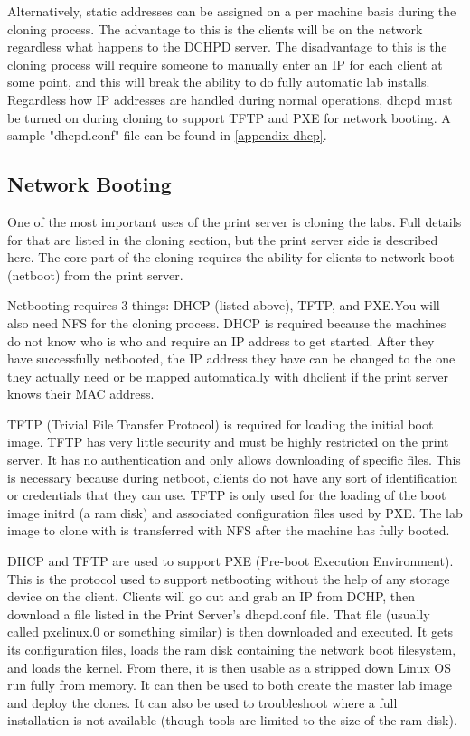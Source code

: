 Alternatively, static addresses can be assigned on a per machine basis during the cloning process.  The advantage to this is the clients will be on the network regardless what happens to the DCHPD server.  The disadvantage to this is the cloning process will require someone to manually enter an IP for each client at some point, and this will break the ability to do fully automatic lab installs.   Regardless how IP addresses are handled during normal operations, dhcpd must be turned on during cloning to support TFTP and PXE for network booting.  A sample "dhcpd.conf" file can be found in \ref{appendix dhcp}.

\subsection{Network Booting}
One of the most important uses of the print server is cloning the labs.  Full details for that are listed in the cloning section, but the print server side is described here.  The core part of the cloning requires the ability for clients to network boot (netboot) from the print server.  

Netbooting requires 3 things:  DHCP (listed above), TFTP, and PXE.You will also need NFS for the cloning process.  DHCP is required because the machines do not know who is who and require an IP address to get started.  After they have successfully netbooted, the IP address they have can be changed to the one they actually need or be mapped automatically with dhclient if the print server knows their MAC address.  

TFTP (Trivial File Transfer Protocol) is required for loading the initial boot image.  TFTP has very little security and must be highly restricted on the print server.  It has no authentication and only allows downloading of specific files.  This is necessary because during netboot, clients do not have any sort of identification or credentials that they can use.  TFTP is only used for the loading of the boot image initrd (a ram disk) and associated configuration files used by PXE.  The lab image to clone with is transferred with NFS after the machine has fully booted.  

DHCP and TFTP are used to support PXE (Pre-boot Execution Environment).  This is the protocol used to support netbooting without the help of any storage device on the client.  Clients will go out and grab an IP from DCHP, then download a file listed in the Print Server's dhcpd.conf file.  That file (usually called pxelinux.0 or something similar) is then downloaded and executed.  It gets its configuration files, loads the ram disk containing the network boot filesystem, and loads the kernel.  From there, it is then usable as a stripped down Linux OS run fully from memory.  It can then be used to both create the master lab image and deploy the clones.  It can also be used to troubleshoot where a full installation is not available (though tools are limited to the size of the ram disk).

